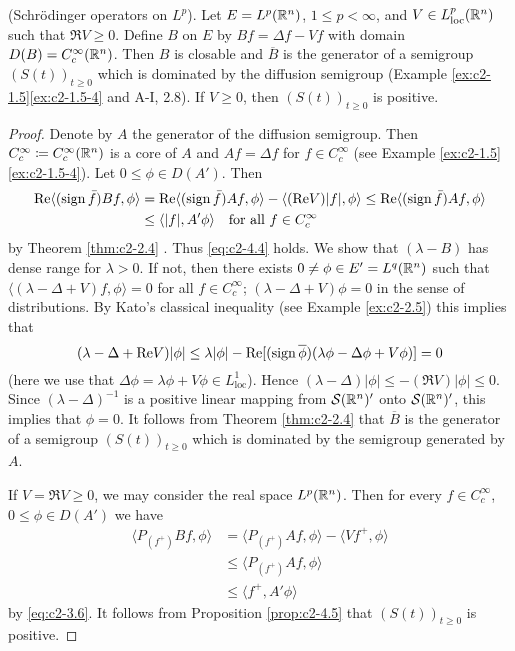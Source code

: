\begin{example}\label{ex:c2-4.7}
(Schrödinger operators on $L^{p}$).
Let $E = L^{p}(\mathbb{R}^{n})$, $1 \leq p < \infty$, and $V \in L^{p}_{\text{loc}}(\mathbb{R}^{n})$ such that $\Re V \geq 0$.
Define $B$ on $E$ by $Bf = \Delta f - Vf$ with domain $D(B) = C^{\infty}_{c}(\mathbb{R}^{n})$. 
Then $B$ is closable and $\overline{B}$ is the generator of a semigroup $(S(t))_{t \geq 0}$ which is dominated by the diffusion semigroup (Example \ref{ex:c2-1.5}\ref{ex:c2-1.5-4} and A-I, 2.8). 
If $V \geq 0$, then $(S(t))_{t \geq 0}$ is positive.
\end{example}

\begin{proof}
Denote by $A$ the generator of the diffusion semigroup. 
Then $C^{\infty}_{c} \coloneq C^{\infty}_{c}(\mathbb{R}^{n})$ is a core of $A$ and $Af = \Delta f$ for $f \in C^{\infty}_{c}$ (see Example \ref{ex:c2-1.5}\ref{ex:c2-1.5-4}). 
Let $0 \leq \phi \in D(A')$. Then
\begin{align*}
\mathop{}\!\mathrm{Re}\langle(\operatorname{sign} \bar{f})Bf,\phi\rangle &= \mathop{}\!\mathrm{Re}\langle(\operatorname{sign} \bar{f})Af,\phi\rangle - \langle(\mathop{}\!\mathrm{Re} V)|f|,\phi\rangle \leq \mathop{}\!\mathrm{Re}\langle(\operatorname{sign} \bar{f})Af,\phi\rangle\\
&\leq \langle|f|,A'\phi\rangle \quad \text{for all } f \in C^{\infty}_{c} 
\end{align*}
by Theorem \ref{thm:c2-2.4}  .
Thus \eqref{eq:c2-4.4} holds.
We show that $(\lambda - B)$ has dense range for $\lambda > 0$. 
If not, then there exists $0 \neq \phi \in E' = L^{q}(\mathbb{R}^{n})$ such that $\langle(\lambda - \Delta + V)f,\phi\rangle = 0$ for all $f \in C^{\infty}_{c}$; \ie $(\lambda - \Delta + V)\phi = 0$ in the sense of distributions. 
By Kato's classical inequality (see Example \ref{ex:c2-2.5}) this implies that
\[
(\lambda - \Delta + \mathop{}\!\mathrm{Re} V)|\phi| \leq \lambda|\phi| - \mathop{}\!\mathrm{Re}[(\operatorname{sign} \overline{\phi})(\lambda\phi - \Delta\phi + V\phi)] = 0
\] 
(here we use that $\Delta\phi = \lambda\phi + V\phi \in L^{1}_{\text{loc}}$). 
Hence $(\lambda - \Delta)|\phi| \leq -(\Re V)|\phi| \leq 0$. 
Since $(\lambda - \Delta)^{-1}$ is a positive linear mapping from $\mathcal{S}(\mathbb{R}^{n})'$ onto $\mathcal{S}(\mathbb{R}^{n})'$, this implies that $\phi = 0$. 
It follows from Theorem \ref{thm:c2-2.4}   that $\overline{B}$ is the
generator of a semigroup $(S(t))_{t \geq 0}$ which is dominated by the semigroup generated by $A$.

If $V = \Re V \geq 0$, we may consider the real space $L^{p}(\mathbb{R}^{n})$. 
Then for every $f \in C^{\infty}_{c}$, $0 \leq \phi \in D(A')$ we have
\begin{align*}
\langle P_{(f^{+})}Bf,\phi\rangle &= \langle P_{(f^{+})}Af,\phi\rangle - \langle Vf^{+},\phi\rangle\\
&\leq \langle P_{(f^{+})}Af,\phi\rangle\\
&\leq \langle f^{+},A'\phi\rangle
\end{align*}
by \eqref{eq:c2-3.6}. 
It follows from  Proposition \ref{prop:c2-4.5} that $(S(t))_{t \geq 0}$ is positive.
\end{proof}

